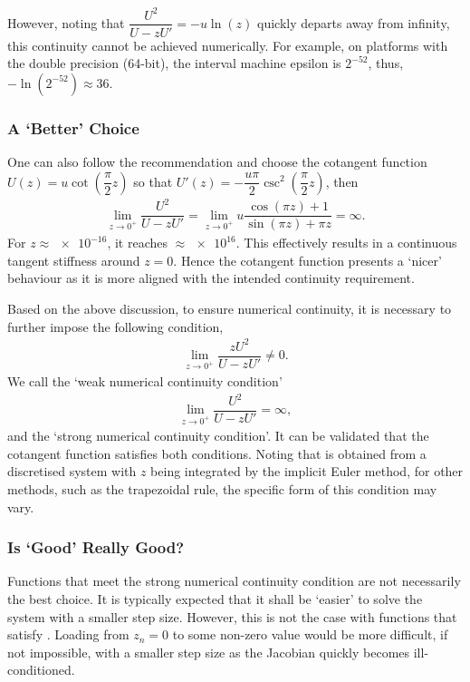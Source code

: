 However, noting that $\dfrac{U^2}{U-zU'}=-u\ln\left(z\right)$ quickly departs away from infinity, this continuity cannot be achieved numerically.
For example, on platforms with the double precision (64-bit), the interval machine epsilon is $2^{-52}$, thus, $-\ln\left(2^{-52}\right)\approx\num{36}$.
\subsubsection{A `Better' Choice}
One can also follow the recommendation and choose the cotangent function $U\left(z\right)=u\cot\left(\dfrac{\pi}{2}z\right)$ so that $U'\left(z\right)=-\dfrac{u\pi}{2}\csc^2\left(\dfrac{\pi}{2}z\right)$, then
\begin{gather}
    \lim\limits_{z\to0^+}\dfrac{U^2}{U-zU'}=\lim\limits_{z\to0^+}u\dfrac{\cos\left(\pi{}z\right)+1}{\sin\left(\pi{}z\right)+\pi{}z}=\infty.
\end{gather}
For $z\approx\num{e-16}$, it reaches $\approx\num{e16}$.
This effectively results in a continuous tangent stiffness around $z=0$.
Hence the cotangent function presents a `nicer' behaviour as it is more aligned with the intended continuity requirement.

Based on the above discussion, to ensure numerical continuity, it is necessary to further impose the following condition,
\begin{gather}\label{eq:continuity}
    \lim\limits_{z\to0^+}\dfrac{zU^2}{U-zU'}\neq0.
\end{gather}
We call  the `weak numerical continuity condition'
\begin{gather}\label{eq:weak_limit}
    \lim\limits_{z\to0^+}\dfrac{U^2}{U-zU'}=\infty,
\end{gather}
and  the `strong numerical continuity condition'.
It can be validated that the cotangent function satisfies both conditions.
Noting that  is obtained from a discretised system with $z$ being integrated by the implicit Euler method, for other methods, such as the trapezoidal rule, the specific form of this condition may vary.
\subsubsection{Is `Good' Really Good?}
Functions that meet the strong numerical continuity condition are not necessarily the best choice.
It is typically expected that it shall be `easier' to solve the system with a smaller step size.
However, this is not the case with functions that satisfy .
Loading from $z_n=0$ to some non-zero value would be more difficult, if not impossible, with a smaller step size as the Jacobian quickly becomes ill-conditioned.

